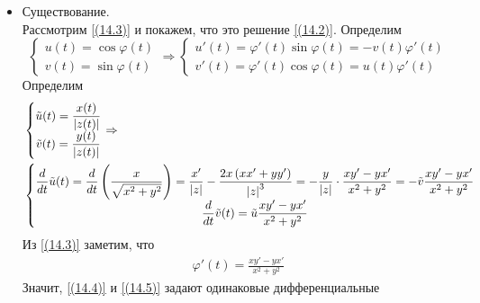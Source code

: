 \begin{itemize}
    \item Существование.
    \\
    Рассмотрим \eqref{(14.3)} и покажем, что это решение \eqref{(14.2)}.
    Определим
    \begin{equation}\label{(14.4)}
        \left\{ \begin{matrix}
                u(t) = \cos \varphi(t) \\
                v(t) = \sin \varphi(t)
            \end{matrix} \right. \Rightarrow \left\{ \begin{matrix}
                u'(t) = \varphi'(t)\sin \varphi(t) = -v(t) \varphi'(t) \\
                v'(t) = \varphi'(t)\cos \varphi(t) = u(t) \varphi'(t) 
            \end{matrix} \right.
    \end{equation}
    Определим
    \begin{equation}\label{(14.5)}
        \begin{split}
            & \left\{ \begin{matrix}
                    \tilde{u}(t) = \displaystyle \frac{x(t)}{\left| z(t) \right|} \\
                    \tilde{v}(t) = \displaystyle \frac{y(t)}{\left| z(t) \right|} \\
                \end{matrix} \right. \Rightarrow \\
            & \left\{ \begin{matrix}
                    \displaystyle \frac{d}{dt} \tilde{u}(t) = \displaystyle \frac{d}{dt}\left( \displaystyle \frac{x}{\sqrt{x^2+y^2}} \right) = \displaystyle \frac{x'}{\left| z \right|} - \displaystyle \frac{2x\left( xx'+yy' \right)}{\left| z \right|^3} = -\displaystyle \frac{y}{\left| z \right|} \cdot \displaystyle \frac{xy'-yx'}{x^2+y^2} = - \tilde{v} \displaystyle \frac{xy'-yx'}{x^2+y^2} \\
                    \displaystyle \frac{d}{dt} \tilde{v}(t) = \tilde{u} \displaystyle \frac{xy'-yx'}{x^2+y^2} \\              
                \end{matrix} \right.
        \end{split}
    \end{equation}
    Из \eqref{(14.3)} заметим, что
    \begin{align*}
      \varphi'(t) = \frac{xy'-yx'}{x^2+y^2}
    \end{align*}
    Значит, \eqref{(14.4)} и \eqref{(14.5)} задают одинаковые дифференциальные

\end{itemize}
